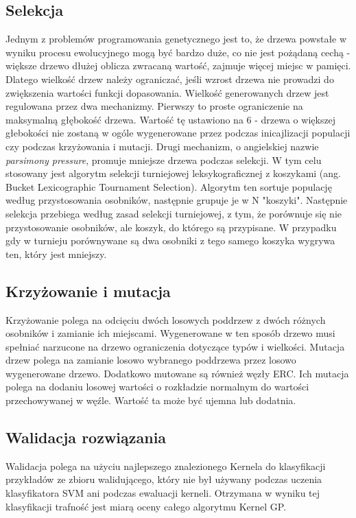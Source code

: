 \subsection{Selekcja}
Jednym z problemów programowania genetycznego jest to, że drzewa powstałe w wyniku procesu ewolucyjnego mogą być bardzo duże, co nie jest pożądaną cechą - większe drzewo dłużej oblicza zwracaną wartość, zajmuje więcej miejsc w pamięci. Dlatego wielkość drzew należy ograniczać, jeśli wzrost drzewa nie prowadzi do zwiększenia wartości funkcji dopasowania.
Wielkość generowanych drzew jest regulowana przez dwa mechanizmy. Pierwszy to proste ograniczenie na maksymalną głębokość drzewa. Wartość tę ustawiono na 6 - drzewa o większej głebokości nie zostaną w ogóle wygenerowane przez podczas inicajlizacji populacji czy podczas krzyżowania i mutacji. Drugi mechanizm, o angielskiej nazwie \textit{parsimony pressure},  promuje mniejsze drzewa podczas selekcji. W tym celu stosowany jest algorytm selekcji turniejowej leksykograficznej z koszykami (ang. Bucket Lexicographic
 Tournament Selection). Algorytm ten sortuje populację według przystosowania osobników, następnie grupuje je w N "koszyki". Następnie selekcja przebiega według zasad selekcji turniejowej, z tym, że porównuje się nie przystosowanie osobników, ale koszyk, do którego są przypisane. W przypadku gdy w turnieju porównywane są dwa osobniki z tego samego koszyka wygrywa ten, który jest mniejszy.

\subsection{Krzyżowanie i mutacja}
Krzyżowanie polega na odcięciu dwóch losowych poddrzew z dwóch różnych osobników i zamianie ich miejscami. Wygenerowane w ten sposób drzewo musi spełniać narzucone na drzewo ograniczenia dotyczące typów i wielkości.
Mutacja drzew polega na zamianie losowo wybranego poddrzewa przez losowo wygenerowane drzewo.
Dodatkowo mutowane są również węzły ERC. Ich mutacja polega na dodaniu losowej wartości o rozkładzie normalnym do wartości przechowywanej w węźle. Wartość ta może być ujemna lub dodatnia.

\subsection{Walidacja rozwiązania}
Walidacja polega na użyciu najlepszego znalezionego Kernela do klasyfikacji przykładów ze zbioru walidującego, który nie był używany podczas uczenia klasyfikatora SVM ani podczas ewaluacji kerneli. Otrzymana w wyniku tej klasyfikacji trafność jest miarą oceny całego algorytmu Kernel GP.

